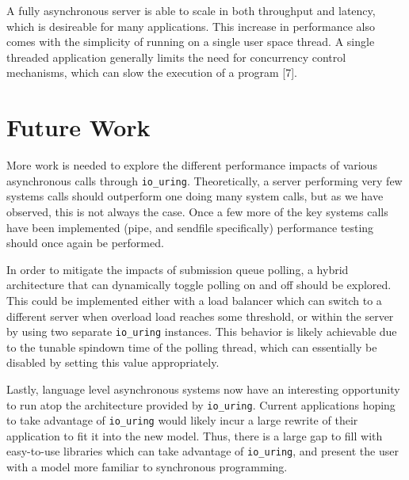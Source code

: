 \documentclass[conference]{IEEEtran}{}
\makeatletter
\newcommand{\citeprocitem}[2]{\hyper@linkstart{cite}{citeproc_bib_item_#1}#2\hyper@linkend}
\makeatother
\begin{document}
A fully asynchronous server is able to scale in both throughput and latency, which is desireable for many applications. This increase in performance also comes with the simplicity of running on a single user space thread. A single threaded application generally limits the need for concurrency control mechanisms, which can slow the execution of a program \citeprocitem{7}{[7]}.

\section{Future Work}
\label{sec:orgb6a3555}
More work is needed to explore the different performance impacts of various asynchronous calls through \texttt{io\_uring}. Theoretically, a server performing very few systems calls should outperform one doing many system calls, but as we have observed, this is not always the case. Once a few more of the key systems calls have been implemented (pipe, and sendfile specifically) performance testing should once again be performed.

In order to mitigate the impacts of submission queue polling, a hybrid architecture that can dynamically toggle polling on and off should be explored. This could be implemented either with a load balancer which can switch to a different server when overload load reaches some threshold, or within the server by using two separate \texttt{io\_uring} instances. This behavior is likely achievable due to the tunable spindown time of the polling thread, which can essentially be disabled by setting this value appropriately.

Lastly, language level asynchronous systems now have an interesting opportunity to run atop the architecture provided by \texttt{io\_uring}. Current applications hoping to take advantage of \texttt{io\_uring} would likely incur a large rewrite of their application to fit it into the new model. Thus, there is a large gap to fill with easy-to-use libraries which can take advantage of \texttt{io\_uring}, and present the user with a model more familiar to synchronous programming.
\end{document}
